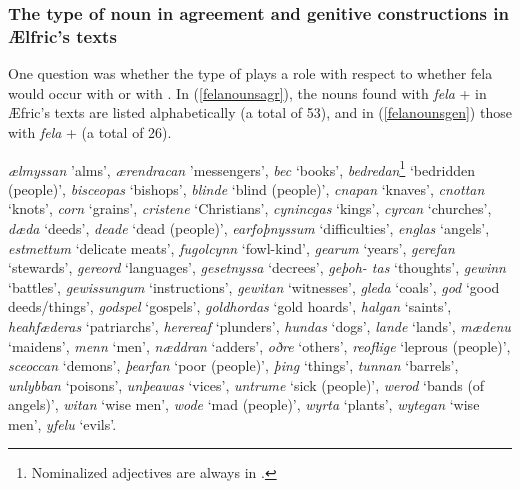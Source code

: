 \documentclass[output=paper,colorlinks,citecolor=brown]{langscibook}
\begin{document}
\subsubsection{The type of noun in agreement and genitive constructions in Ælfric’s texts}\label{sssect:nountype}

One question was whether the type of  plays a role with respect to whether fela would occur with  or with . In (\ref{felanounsagr}), the nouns found with \textit{fela} +  in Æfric’s texts are listed alphabetically (a total of 53), and in (\ref{felanounsgen}) those with \textit{fela} +  (a total of 26). 


\begin{exe}
    \ex \label{felanounsagr}
\textit{ælmyssan} 'alms', \textit{ærendracan} 'messengers', \textit{bec} ‘books’, \textit{bedredan}\footnote{Nominalized adjectives are always in .} ‘bedridden (people)’, \textit{bisceopas} ‘bishops’, \textit{blinde} ‘blind (people)’, \textit{cnapan} ‘knaves’, \textit{cnottan} ‘knots’, \textit{corn} ‘grains’, \textit{cristene} ‘Christians’, \textit{cynincgas} ‘kings’, \textit{cyrcan} ‘churches’, \textit{dæda} ‘deeds’, \textit{deade} ‘dead (people)’, \textit{earfoþnyssum} ‘difficulties’, \textit{englas} ‘angels’,\textit{ estmettum} ‘delicate meats’, \textit{fugolcynn} ‘fowl-kind’, \textit{gearum} ‘years’, \textit{gerefan} ‘stewards’, \textit{gereord} ‘languages’, \textit{gesetnyssa} ‘decrees’, \textit{geþoh- tas} ‘thoughts’, \textit{gewinn} ‘battles’, \textit{gewissungum} ‘instructions’, \textit{gewitan} ‘witnesses’, \textit{gleda} ‘coals’, \textit{god} ‘good deeds/things’, \textit{godspel} ‘gospels’, \textit{goldhordas} ‘gold hoards’, \textit{halgan} ‘saints’, \textit{heahfæderas} ‘patriarchs’, \textit{herereaf} ‘plunders’, \textit{hundas} ‘dogs’, \textit{lande }‘lands’, \textit{mædenu} ‘maidens’, \textit{menn} ‘men’, \textit{næddran} ‘adders’, \textit{oðre} ‘others’, \textit{reoflige} ‘leprous (people)’, \textit{sceoccan} ‘demons’, \textit{þearfan} ‘poor (people)’, \textit{þing} ‘things’, \textit{tunnan} ‘barrels’, \textit{unlybban} ‘poisons’, \textit{unþeawas} ‘vices’, \textit{untrume} ‘sick (people)’, \textit{werod} ‘bands (of angels)’, \textit{witan} ‘wise men’, \textit{wode} ‘mad (people)’,\textit{ wyrta }‘plants’, \textit{wytegan }‘wise men’, \textit{yfelu} ‘evils’. 
\end{exe}
\end{document}
